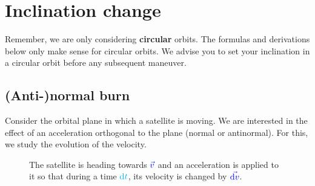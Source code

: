 \begin{figure}[H]
\centering
{}
\end{figure}

\clearpage



\section{Inclination change}

\begin{important}
Remember, we are only considering \textbf{circular} orbits. The formulas
and derivations below only make sense for circular orbits. We advise
you to set your inclination in a circular orbit before any subsequent
maneuver.
\end{important}


\subsection{(Anti-)normal burn}

Consider the orbital plane in which a satellite is moving. We are
interested in the effect of an acceleration orthogonal to the plane
(normal or antinormal). For this, we study the evolution of the velocity.

\begin{figure}[H]
\centering
{}
\caption{
	The satellite is heading towards $\textcolor{blue}{\vec v}$ and an
	acceleration is applied to it so that during a time $\textcolor{cyan}{\mathrm{d} t}$,
	its velocity is changed by $\textcolor{blue}{\vec{\mathrm{d} v}}$.
}
\label{fig:normalburn}
\end{figure}

